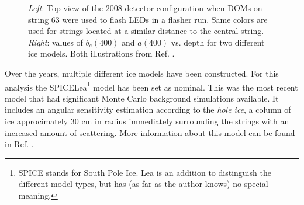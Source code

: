 \begin{figure}[ht]
\begin{minipage}{6in}
  \centering
  \hspace*{.7in}
\end{minipage}
\caption{\textit{Left}: Top view of the 2008 detector configuration when DOMs on string 63 were used to flash LEDs in a flasher run. Same colors are used for strings located at a similar distance to the central string. \textit{Right}: values of $b_{e}(400)$ and $a(400)$ vs. depth for two different ice models. Both illustrations from Ref. \cite{1412998}.}
%
\label{fig:2008config}
\end{figure}

Over the years, multiple different ice models have been constructed. For this analysis the SPICELea\footnote{SPICE stands for South Pole Ice. Lea is an addition to distinguish the different model types, but has (as far as the author knows) no special meaning.} model has been set as nominal. This was the most recent model that had significant Monte Carlo background simulations available. It includes an angular sensitivity estimation according to the \textit{hole ice}, a column of ice approcimately 30 cm in radius immediately surrounding the strings with an increased amount of scattering. More information about this model can be found in Ref. \cite{1412998}.
